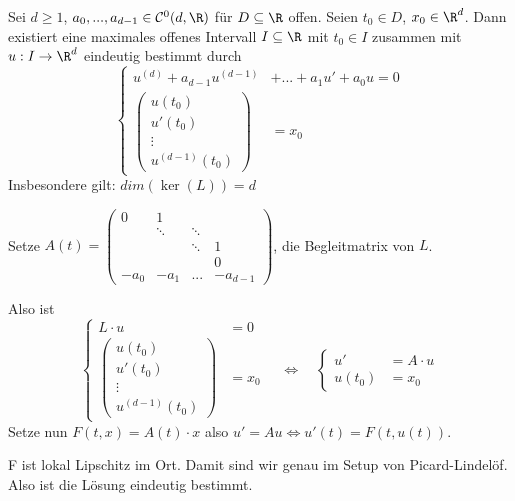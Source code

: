 \documentclass[main.tex]{subfiles}
\begin{document}
\begin{Korollar}
  Sei $d \geq 1$, $a_0,...,a_{d-1} \in \mathcal{C}^0(d,\R)$ für $D \subseteq \R$ offen. Seien $t_0 \in D$, $x_0 \in \R^d$. Dann existiert eine maximales offenes Intervall $I \subseteq \R$ mit $t_0 \in I$ zusammen mit $u: I \to \R^d$ eindeutig bestimmt durch
  $$\left\{\begin{aligned}
    u^{(d)} + a_{d-1}u^{(d-1)} & + ... + a_1 u' + a_0 u = 0 \\
    \begin{pmatrix}
      u(t_0) \\ u'(t_0) \\ \vdots \\ u^{(d-1)}(t_0)
    \end{pmatrix} & = x_0
  \end{aligned}\right.$$
  Insbesondere gilt: $dim(\ker(L)) = d$
\end{Korollar}

\begin{Beweis}
  Setze $A(t) = \begin{pmatrix}
    0 & 1 & & \\
    & \ddots & \ddots & \\
    & & \ddots & 1 \\
    & & & 0 \\
    -a_0 & -a_1 & ... & -a_{d-1}
  \end{pmatrix}$, die Begleitmatrix von $L$.

  Also ist
  $$\left\{\begin{aligned}
    L\cdot u & = 0 \\
    \begin{pmatrix}
      u(t_0) \\ u'(t_0) \\ \vdots \\ u^{(d-1)}(t_0)
    \end{pmatrix} & = x_0
  \end{aligned}\right. \quad \Leftrightarrow \quad \left\{\begin{aligned}
    u' & = A \cdot u \\
    u(t_0) & = x_0
  \end{aligned}\right.$$
  Setze nun $F(t,x) = A(t) \cdot x$ also $u' = Au \Leftrightarrow u'(t) = F(t,u(t))$.

  F ist lokal Lipschitz im Ort. Damit sind wir genau im Setup von Picard-Lindelöf. Also ist die Lösung eindeutig bestimmt.
\end{Beweis}
\end{document}
